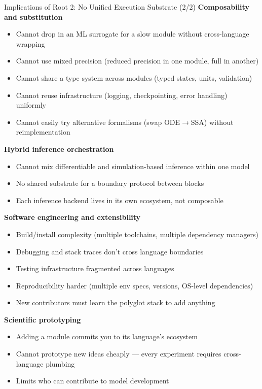 \documentclass[aspectratio=169]{beamer}
\begin{document}
\begin{frame}[noframenumbering]{Implications of Root 2: No Unified Execution Substrate (2/2)}
	\scriptsize
	\textbf{Composability and substitution}
	\begin{itemize}\itemsep0pt\parskip0pt
		\item Cannot drop in an ML surrogate for a slow module without cross-language wrapping
		\item Cannot use mixed precision (reduced precision in one module, full in another)
		\item Cannot share a type system across modules (typed states, units, validation)
		\item Cannot reuse infrastructure (logging, checkpointing, error handling) uniformly
		\item Cannot easily try alternative formalisms (swap ODE$\to$SSA) without reimplementation
	\end{itemize}

	\smallskip
	\textbf{Hybrid inference orchestration}
	\begin{itemize}\itemsep0pt\parskip0pt
		\item Cannot mix differentiable and simulation-based inference within one model
		\item No shared substrate for a boundary protocol between blocks
		\item Each inference backend lives in its own ecosystem, not composable
	\end{itemize}

	\smallskip
	\textbf{Software engineering and extensibility}
	\begin{itemize}\itemsep0pt\parskip0pt
		\item Build/install complexity (multiple toolchains, multiple dependency managers)
		\item Debugging and stack traces don't cross language boundaries
		\item Testing infrastructure fragmented across languages
		\item Reproducibility harder (multiple env specs, versions, OS-level dependencies)
		\item New contributors must learn the polyglot stack to add anything
	\end{itemize}

	\smallskip
	\textbf{Scientific prototyping}
	\begin{itemize}\itemsep0pt\parskip0pt
		\item Adding a module commits you to its language's ecosystem
		\item Cannot prototype new ideas cheaply --- every experiment requires cross-language plumbing
		\item Limits who can contribute to model development
	\end{itemize}
\end{frame}
\end{document}

